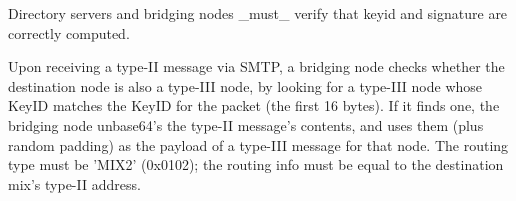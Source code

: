 Directory servers and bridging nodes _must_ verify that keyid and
signature are correctly computed.

Upon receiving a type-II message via SMTP, a bridging node checks
whether the destination node is also a type-III node, by looking for a
type-III node whose KeyID matches the KeyID for the packet (the first
16 bytes).  If it finds one, the bridging node unbase64's the type-II
message's contents, and uses them (plus random padding) as the payload
of a type-III message for that node.  The routing type must be 'MIX2'
(0x0102); the routing info must be equal to the destination mix's
type-II address.
